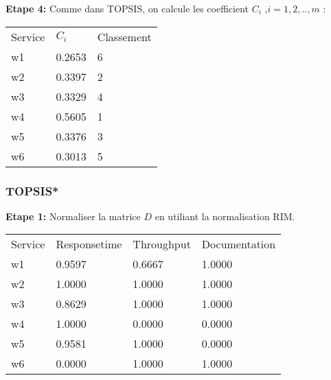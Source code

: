 \documentclass[french, 11pt, a4paper, oldfontcommands]{report}
\begin{document}
	\textbf{Etape 4:} Comme dans TOPSIS, on calcule les coefficient $C_{i}$ ,\textit{$i = 1,2,..,m$  }:
\begin{table}[ht]
	\begin{tabular}{lll}
	\rowcolor[HTML]{9B9B9B} 
	Service & $C_i$  & Classement \\
	w1      & 0.2653 & 6          \\
	\rowcolor[HTML]{EFEFEF} 
	w2      & 0.3397 & 2          \\
	w3      & 0.3329 & 4          \\
	\rowcolor[HTML]{EFEFEF} 
	w4      & 0.5605 & 1          \\
	w5      & 0.3376 & 3          \\
	\rowcolor[HTML]{EFEFEF} 
	w6      & 0.3013 & 5         
	\end{tabular}
	\end{table}
	\newpage
	\subsubsection{TOPSIS*}
	\textbf{Etape 1:} Normaliser la matrice $D$ en utiliant la normalisation RIM.
\begin{table}[ht]
	\begin{tabular}{llll}
	\rowcolor[HTML]{9B9B9B} 
	Service & Responsetime & Throughput & Documentation \\
	w1      & 0.9597       & 0.6667     & 1.0000        \\
	\rowcolor[HTML]{EFEFEF} 
	w2      & 1.0000       & 1.0000     & 1.0000        \\
	w3      & 0.8629       & 1.0000     & 1.0000        \\
	\rowcolor[HTML]{EFEFEF} 
	w4      & 1.0000       & 0.0000     & 0.0000        \\
	w5      & 0.9581       & 1.0000     & 0.0000        \\
	\rowcolor[HTML]{EFEFEF} 
	w6      & 0.0000       & 1.0000     & 1.0000       
	\end{tabular}
	\end{table}
\end{document}
